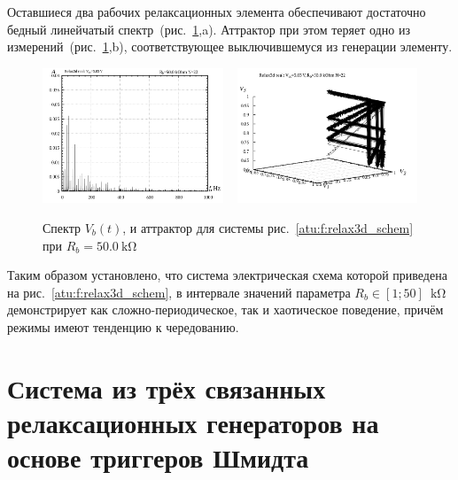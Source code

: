 Оставшиеся два рабочих релаксационных элемента обеспечивают
достаточно бедный линейчатый спектр~(рис.~\ref{atu:f:relax3d_f_22},a).
Аттрактор при этом теряет одно из измерений~(рис.~\ref{atu:f:relax3d_f_22},b),
соответствующее выключившемуся из генерации элементу.

\begin{figure}[htb!]
  \centerline{
    \includegraphics[width=0.48\textwidth]{p/relax3d_f_22.png}
    ~
    \includegraphics[width=0.48\textwidth]{p/relax3d_v1v2v3_22.png}
  }
  \caption{Спектр $V_b(t)$, и аттрактор для системы рис.~\ref{atu:f:relax3d_schem} при $R_b=\SI{50.0}{\kilo\ohm}$ }
  \label{atu:f:relax3d_f_22}
\end{figure}

Таким образом установлено, что
система электрическая схема которой приведена на рис.~\ref{atu:f:relax3d_schem},
в интервале значений параметра $R_b \in [1;50]\;\SI{}{\kilo\ohm}$
демонстрирует как сложно-периодическое, так и хаотическое поведение,
причём режимы имеют тенденцию к чередованию.

\section{Система из трёх связанных релаксационных генераторов на основе триггеров Шмидта}
\label{atu:sec:relax3ds}

